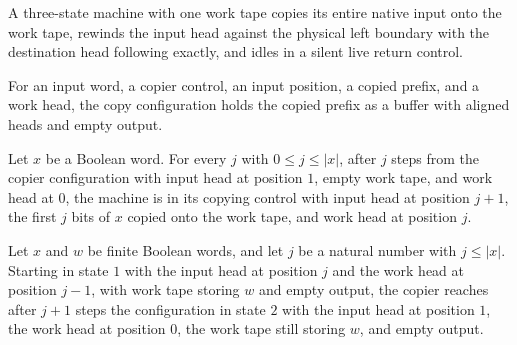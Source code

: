 \begin{definition}
\label{Complexity.clInputTM}
\leanok
{}
A three-state machine with one work tape copies its entire native input onto the work tape, rewinds the input head against the physical left boundary with the destination head following exactly, and idles in a silent live return control.
\end{definition}

\begin{definition}
\label{Complexity.clInputCfg}
\leanok
{}
For an input word, a copier control, an input position, a copied prefix, and a work head, the copy configuration holds the copied prefix as a buffer with aligned heads and empty output.
\end{definition}

\begin{lemma}
\label{Complexity.clInput_forward}
\leanok
{}
Let $x$ be a Boolean word. For every $j$ with $0\le j\le |x|$, after $j$ steps from the
copier configuration with input head at position $1$, empty work tape, and work head at
$0$, the machine is in its copying control with input head at position $j+1$, the first
$j$ bits of $x$ copied onto the work tape, and work head at position $j$.
\end{lemma}

\begin{lemma}
\label{Complexity.clInput_backward}
\leanok
{}
Let $x$ and $w$ be finite Boolean words, and let $j$ be a natural number with $j \le
|x|$. Starting in state $1$ with the input head at position $j$ and the work head at
position $j-1$, with work tape storing $w$ and empty output, the copier reaches after
$j+1$ steps the configuration in state $2$ with the input head at position $1$, the work
head at position $0$, the work tape still storing $w$, and empty output.
\end{lemma}

